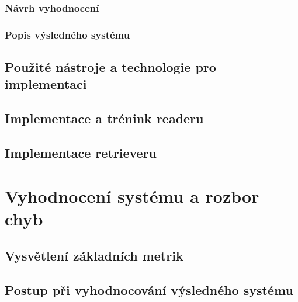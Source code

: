 \subsection{Návrh vyhodnocení}

\subsection{Popis výsledného systému}
\section{Použité nástroje a technologie pro implementaci}
\label{pouzite_nastroje}


\section{Implementace a trénink readeru}
\label{reader}


\section{Implementace retrieveru}
\label{retriever_imp}






\chapter{Vyhodnocení systému a rozbor chyb}
\label{system_evaluation}



\section{Vysvětlení základních metrik}


\section{Postup při vyhodnocování výsledného systému}


